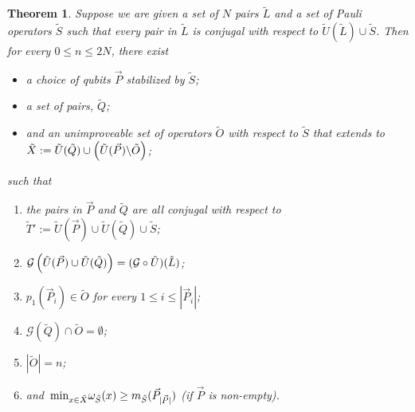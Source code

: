 \documentclass[twocolumn,showpacs,preprintnumbers,amsmath,amssymb,nofootinbib,pra,floatfix]{revtex4-1}
\newtheorem{theorem}{Theorem}
\newcommand{\lst}{\vec}
\newcommand{\set}{\tilde}
\newcommand{\genfun}{\mathcal{G}}
\begin{document}
\begin{theorem}
Suppose we are given a set of $N$ pairs $\set L$ and a set of Pauli operators $\set S$ such that every pair in $\set L$ is conjugal with respect to $\set U(\set L)\cup\set S$.  Then for every $0\le n \le 2N$, there exist
\begin{itemize}
\item a choice of qubits $\lst P$ stabilized by $\set S$;
\item a set of pairs, $\set Q$;
\item and an unimproveable set of operators $\set O$ with respect to $\set S$ that extends to $\set X:=\set U(\set Q) \cup \paren{\set U(\lst P) \backslash \set O}$;
\end{itemize}
such that
\begin{enumerate}
\item \label{pairs are all conjugal to T} the pairs in $\lst P$ and $\set Q$ are all conjugal with respect to $\set T':=\set U(\lst P)\cup \set U(\set Q)\cup \set S$;
\item \label{P and Q generate the same set as L} $\genfun\paren{\set U(\lst P)\cup \set U(\set Q)}=(\genfun\circ\set U)(\set L)$;
\item \label{first members are all in O} $p_1(\lst P_i)\in \set O$ for every $1 \le i \le |\lst P_i|$;
\item \label{Q does not intersect with O} $\genfun(\set Q) \cap \set O = \emptyset$;
\item \label{size of O matches arbitrarily chosen integer} $|\set O|=n$;
\item \label{operators in X are no worse than the best qubit in P} and $\min_{x\in\set X}\om_{\set S}(x)\ge m_{\set S}(\lst P_{|\lst P|})$ (if $\lst P$ is non-empty).
\end{enumerate}
\end{theorem}
\end{document}
